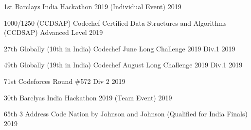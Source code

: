 




\begin{cvhonors}


\cvhonor
{1st} %
{Barclays India Hackathon 2019 (Individual Event)} %
{} %
{2019} %


\cvhonor
{1000/1250 (CCDSAP)} %
{Codechef Certified Data Structures and Algorithms (CCDSAP) Advanced Level} %
{} %
{2019} %


\cvhonor
{27th Globally (10th in India)} %
{Codechef June Long Challenge 2019 Div.1} %
{} %
{2019} %


\cvhonor
{49th Globally (19th in India)} %
{Codechef August Long Challenge 2019 Div.1} %
{} %
{2019} %


\cvhonor
{71st} %
{Codeforces Round \#572 Div 2} %
{} %
{2019} %


\cvhonor
{30th} %
{Barclyas India Hackathon 2019 (Team Event)} %
{} %
{2019} %


\cvhonor
{65th} %
{3 Address Code Nation by Johnson and Johnson (Qualified for India Finals)} %
{} %
{2019} %


\end{cvhonors}
